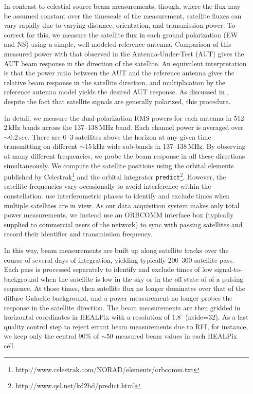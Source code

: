 \documentclass{emulateapj}
\begin{document}
In contrast to celestial source beam measurements, though, where the flux may be assumed constant over the timescale of the measurement, satellite fluxes can vary rapidly due to varying distance, orientation, and transmission power. To correct for this, we measure the satellite flux in each ground polarization (EW and NS) using a simple, well-modeled reference antenna. Comparison of this measured power with that observed in the Antenna-Under-Test (AUT) gives the AUT beam response in the direction of the satellite. An equivalent interpretation is that the power ratio between the AUT and the reference antenna gives the relative beam response in the satellite direction, and multiplication by the reference antenna model yields the desired AUT response. As discussed in \citet{neben15}, despite the fact that satellite signals are generally polarized, this procedure.

In detail, we measure the dual-polarization RMS powers for each antenna in 512 2\,kHz bands across the 137--138\,MHz band. Each channel power is averaged over $\sim0.2$\,sec. There are 0--3 satellites above the horizon at any given time transmitting on different $\sim15$\,kHz wide sub-bands in 137--138\,MHz. By observing at many different frequencies, we probe the beam response in all these directions simultaneously. We compute the satellite positions using the orbital elements published by Celestrak\footnote{http://www.celestrak.com/NORAD/elements/orbcomm.txt} and the orbital integrator \texttt{predict}\footnote{http://www.qsl.net/kd2bd/predict.html}. However, the satellite frequencies vary occasionally to avoid interference within the constellation. \citet{zheng14} use interferometric phases to identify and exclude times when multiple satellites are in view. As our data acquisition system makes only total power measurements, we instead use an ORBCOMM interface box (typically supplied to commercial users of the network) to sync with passing satellites and record their identifier and transmission frequency.

In this way, beam measurements are built up along satellite tracks over the course of several days of integration, yielding typically 200--300 satellite pass. Each pass is processed separately to identify and exclude times of low signal-to-background when the satellite is low in the sky or in the off state of of a pulsing sequence. At those times, then satellite flux no longer dominates over that of the diffuse Galactic background, and a power measurement no longer probes the response in the satellite direction. The beam measurements are then gridded in horizontal coordinates in HEALPix with a resolution of $1.8^\circ$ (nside=32). As a last quality control step to reject errant beam measurements due to RFI, for instance, we keep only the central 90\% of $\sim50$ measured beam values in each HEALPix cell.
\end{document}
